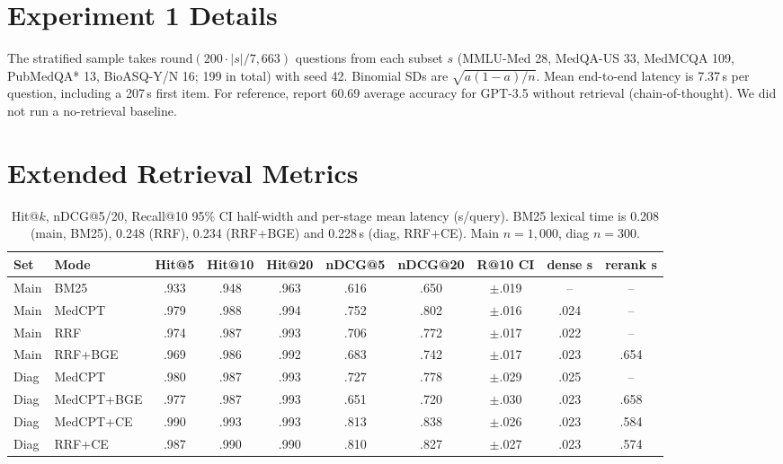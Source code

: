 \documentclass[11pt]{article}
\begin{document}
\section{Experiment 1 Details}\label{app:exp1}
The stratified sample takes $\mathrm{round}(200\cdot|s|/7{,}663)$ questions from each subset $s$ (MMLU-Med 28, MedQA-US 33, MedMCQA 109, PubMedQA* 13, BioASQ-Y/N 16; 199 in total) with seed 42. Binomial SDs are $\sqrt{a(1-a)/n}$. Mean end-to-end latency is 7.37\,s per question, including a 207\,s first item. For reference, \citet[Table 7]{xiong2024benchmarking} report 60.69 average accuracy for GPT-3.5 without retrieval (chain-of-thought). We did not run a no-retrieval baseline. %

\section{Extended Retrieval Metrics}\label{app:ret}
\begin{table}[h]
\centering\small
\begin{tabular}{llcccccccc}
\toprule
Set & Mode & Hit@5 & Hit@10 & Hit@20 & nDCG@5 & nDCG@20 & R@10 CI & dense s & rerank s \\
\midrule
Main & BM25 & .933 & .948 & .963 & .616 & .650 & $\pm$.019 & -- & -- \\
Main & MedCPT & .979 & .988 & .994 & .752 & .802 & $\pm$.016 & .024 & -- \\
Main & RRF & .974 & .987 & .993 & .706 & .772 & $\pm$.017 & .022 & -- \\
Main & RRF+BGE & .969 & .986 & .992 & .683 & .742 & $\pm$.017 & .023 & .654 \\
\midrule
Diag & MedCPT & .980 & .987 & .993 & .727 & .778 & $\pm$.029 & .025 & -- \\
Diag & MedCPT+BGE & .977 & .987 & .993 & .651 & .720 & $\pm$.030 & .023 & .658 \\
Diag & MedCPT+CE & .990 & .993 & .993 & .813 & .838 & $\pm$.026 & .023 & .584 \\
Diag & RRF+CE & .987 & .990 & .990 & .810 & .827 & $\pm$.027 & .023 & .574 \\
\bottomrule
\end{tabular}
\caption{Hit@$k$, nDCG@5/20, Recall@10 95\% CI half-width and per-stage mean latency (s/query). BM25 lexical time is 0.208 (main, BM25), 0.248 (RRF), 0.234 (RRF+BGE) and 0.228\,s (diag, RRF+CE). Main $n=1{,}000$, diag $n=300$.} %
\label{tab:ret-ext}
\end{table}
\end{document}
